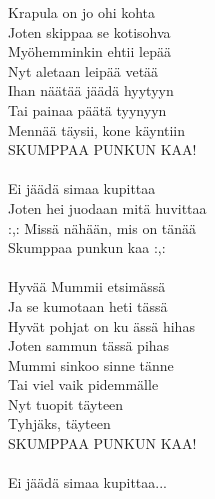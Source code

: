 
Krapula on jo ohi kohta \\ Joten skippaa se kotisohva \\ Myöhemminkin ehtii lepää \\ Nyt aletaan leipää vetää \\ Ihan näätää jäädä hyytyyn \\ Tai painaa päätä tyynyyn \\ Mennää täysii, kone käyntiin \\ SKUMPPAA PUNKUN KAA! \\ \hspace{10mm} \\ Ei jäädä simaa kupittaa \\ Joten hei juodaan mitä huvittaa \\ :,: Missä nähään, mis on tänää \\ Skumppaa punkun kaa :,: \\ \hspace{10mm} \\ Hyvää Mummii etsimässä \\ Ja se kumotaan heti tässä \\ Hyvät pohjat on ku ässä hihas \\ Joten sammun tässä pihas \\ Mummi sinkoo sinne tänne \\ Tai viel vaik pidemmälle \\ Nyt tuopit täyteen \\ Tyhjäks, täyteen \\ SKUMPPAA PUNKUN KAA! \\ \hspace{10mm} \\ Ei jäädä simaa kupittaa...